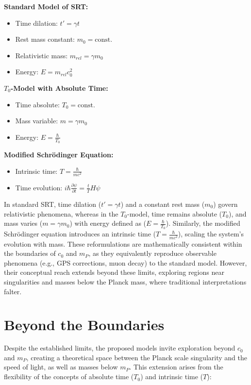\documentclass[a4paper,12pt]{article}
\begin{document}
	\begin{tcolorbox}[colback=blue!5!white,colframe=blue!75!black,title=Model Definitions]
		\textbf{Standard Model of SRT:}
		\begin{itemize}
			\item Time dilation: $t' = \gamma t$
			\item Rest mass constant: $m_0 = \text{const.}$
			\item Relativistic mass: $m_{rel} = \gamma m_0$
			\item Energy: $E = m_{rel}c_0^2$
		\end{itemize}
		
		\textbf{$T_0$-Model with Absolute Time:}
		\begin{itemize}
			\item Time absolute: $T_0 = \text{const.}$
			\item Mass variable: $m = \gamma m_0$
			\item Energy: $E = \frac{\hbar}{T_0}$
		\end{itemize}
		
		\textbf{Modified Schrödinger Equation:}
		\begin{itemize}
			\item Intrinsic time: $T = \frac{\hbar}{mc^2}$
			\item Time evolution: $i\hbar\frac{\partial\psi}{\partial t} = \frac{t}{T}H\psi$
		\end{itemize}
	\end{tcolorbox}
	
	In standard SRT, time dilation (\( t' = \gamma t \)) and a constant rest mass (\( m_0 \)) govern relativistic phenomena, whereas in the \( T_0 \)-model, time remains absolute (\( T_0 \)), and mass varies (\( m = \gamma m_0 \)) with energy defined as (\( E = \frac{\hbar}{T_0} \)). Similarly, the modified Schrödinger equation introduces an intrinsic time (\( T = \frac{\hbar}{m c^2} \)), scaling the system's evolution with mass. These reformulations are mathematically consistent within the boundaries of \( c_0 \) and \( m_P \), as they equivalently reproduce observable phenomena (e.g., GPS corrections, muon decay) to the standard model. However, their conceptual reach extends beyond these limits, exploring regions near singularities and masses below the Planck mass, where traditional interpretations falter.
	
	\section{Beyond the Boundaries}
	Despite the established limits, the proposed models invite exploration beyond \( c_0 \) and \( m_P \), creating a theoretical space between the Planck scale singularity and the speed of light, as well as masses below \( m_P \). This extension arises from the flexibility of the concepts of absolute time (\( T_0 \)) and intrinsic time (\( T \)):
	
\end{document}
